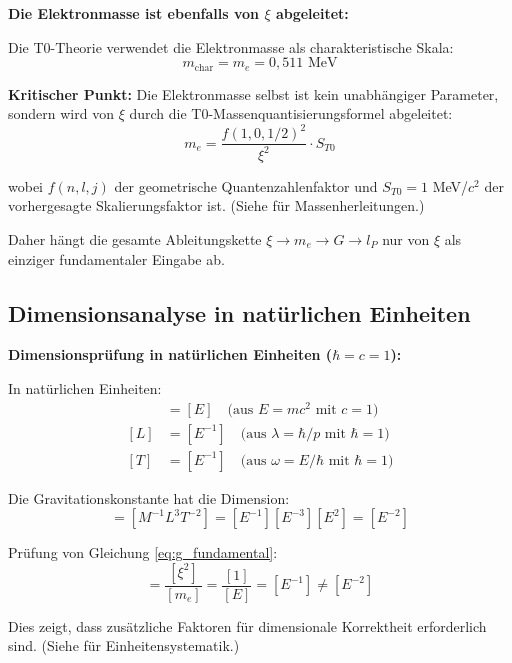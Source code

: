 	\begin{insight}
		\textbf{Die Elektronmasse ist ebenfalls von $\xi$ abgeleitet:}
		
		Die T0-Theorie verwendet die Elektronmasse als charakteristische Skala:
		\begin{equation}
			m_{\text{char}} = m_e = 0{,}511 \text{ MeV}
			\label{eq:characteristic_mass}
		\end{equation}
		
		\textbf{Kritischer Punkt:} Die Elektronmasse selbst ist kein unabhängiger Parameter, sondern wird von $\xi$ durch die T0-Massenquantisierungsformel abgeleitet:
		\begin{equation}
			m_e = \frac{f(1,0,1/2)^2}{\xi^2} \cdot S_{T0}
		\end{equation}
		
		wobei $f(n,l,j)$ der geometrische Quantenzahlenfaktor und $S_{T0} = 1$ MeV/$c^2$ der vorhergesagte Skalierungsfaktor ist. (Siehe \cite{T0_Teilchenmassen_De} für Massenherleitungen.)
		
		Daher hängt die gesamte Ableitungskette $\xi \to m_e \to G \to l_P$ nur von $\xi$ als einziger fundamentaler Eingabe ab.
	\end{insight}
	
	\subsection{Dimensionsanalyse in natürlichen Einheiten}
	
	\begin{derivation}
		\textbf{Dimensionsprüfung in natürlichen Einheiten ($\hbar = c = 1$):}
		
		In natürlichen Einheiten:
		\begin{align}
			[M] &= [E] \quad \text{(aus } E = mc^2 \text{ mit } c = 1\text{)} \\
			[L] &= [E^{-1}] \quad \text{(aus } \lambda = \hbar/p \text{ mit } \hbar = 1\text{)} \\
			[T] &= [E^{-1}] \quad \text{(aus } \omega = E/\hbar \text{ mit } \hbar = 1\text{)}
		\end{align}
		
		Die Gravitationskonstante hat die Dimension:
		\begin{equation}
			[G] = [M^{-1}L^3T^{-2}] = [E^{-1}][E^{-3}][E^2] = [E^{-2}]
		\end{equation}
		
		Prüfung von Gleichung \eqref{eq:g_fundamental}:
		\begin{equation}
			[G] = \frac{[\xi^2]}{[m_e]} = \frac{[1]}{[E]} = [E^{-1}] \neq [E^{-2}]
		\end{equation}
		
		Dies zeigt, dass zusätzliche Faktoren für dimensionale Korrektheit erforderlich sind. (Siehe \cite{NatEinheitenSystematik_De} für Einheitensystematik.)
	\end{derivation}
	
